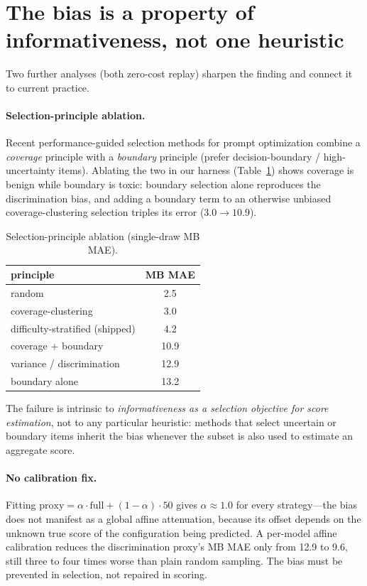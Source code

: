 \section{The bias is a property of informativeness, not one heuristic}

Two further analyses (both zero-cost replay) sharpen the finding and connect it to current
practice.

\paragraph{Selection-principle ablation.} Recent performance-guided selection methods for
prompt optimization \citep{ipomp2025} combine a \emph{coverage} principle with a
\emph{boundary} principle (prefer decision-boundary / high-uncertainty items). Ablating the
two in our harness (Table~\ref{tab:ablation}) shows coverage is benign while boundary is
toxic: boundary selection alone reproduces the discrimination bias, and adding a boundary
term to an otherwise unbiased coverage-clustering selection triples its error
($3.0 \to 10.9$).

\begin{table}[H]
\centering
\caption{Selection-principle ablation (single-draw MB MAE).}
\label{tab:ablation}
\begin{tabular}{lc}
\toprule
principle & MB MAE \\
\midrule
random & 2.5 \\
coverage-clustering & 3.0 \\
difficulty-stratified (shipped) & 4.2 \\
coverage + boundary & 10.9 \\
variance / discrimination & 12.9 \\
boundary alone & 13.2 \\
\bottomrule
\end{tabular}
\end{table}

The failure is intrinsic to \emph{informativeness as a selection objective for score
estimation}, not to any particular heuristic: methods that select uncertain or boundary
items inherit the bias whenever the subset is also used to estimate an aggregate score.

\paragraph{No calibration fix.} Fitting $\text{proxy} = \alpha\cdot\text{full} +
(1-\alpha)\cdot 50$ gives $\alpha \approx 1.0$ for every strategy---the bias does not manifest
as a global affine attenuation, because its offset depends on the unknown true score of the
configuration being predicted. A per-model affine calibration reduces the discrimination
proxy's MB MAE only from 12.9 to 9.6, still three to four times worse than plain random
sampling. The bias must be prevented in selection, not repaired in scoring.

